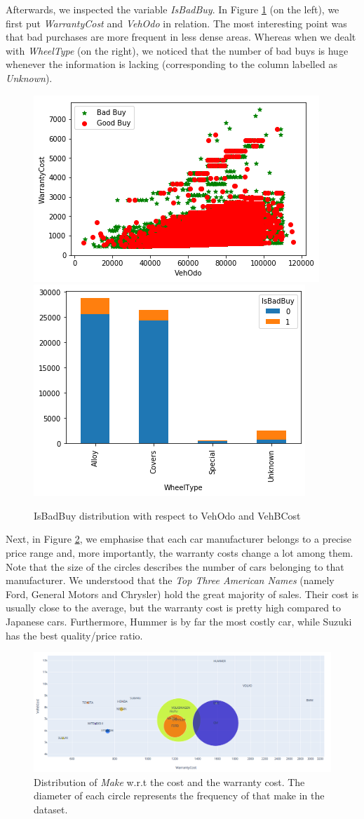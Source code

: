 \documentclass{article}
\begin{document}
	
	Afterwards, we inspected the variable \emph{IsBadBuy}. In Figure \ref{fig:badbuys} (on the left), we first put \emph{WarrantyCost} and \emph{VehOdo} in relation. The most interesting point was that bad purchases are more frequent in less dense areas. Whereas when we dealt with \emph{WheelType} (on the right), we noticed that the number of bad buys is huge whenever the information is lacking (corresponding to the column labelled as \emph{Unknown}).
	
	
	\begin{figure}[H]
		\centering
		\includegraphics[width=.4\textwidth, keepaspectratio]{badbuys} \hspace{1cm}
		\includegraphics[width=.33\textwidth, keepaspectratio]{wheeltype}
		\caption{IsBadBuy distribution with respect to VehOdo and VehBCost}
		\label{fig:badbuys}
	\end{figure}
	
	Next, in Figure \ref{fig:fantastic}, we emphasise that each car manufacturer belongs to a precise price range and, more importantly, the warranty costs change a lot among them. Note that the size of the circles describes the number of cars belonging to that manufacturer. We understood that the \emph{Top Three American Names} (namely Ford, General Motors and Chrysler) hold the great majority of sales. Their cost is usually close to the average, but the warranty cost is pretty high compared to Japanese cars. Furthermore, Hummer is by far the most costly car, while Suzuki has the best quality/price ratio.
	
	
	\begin{figure}[H]
		\centering
		\captionsetup{justification=centering}
		\includegraphics[width=.95\textwidth, keepaspectratio]{fantastic.png} 
		\caption{Distribution of \emph{Make} w.r.t the cost and the warranty cost. The diameter of each circle represents the frequency of that make in the dataset.}
		\label{fig:fantastic}
	\end{figure}
	
\end{document}
